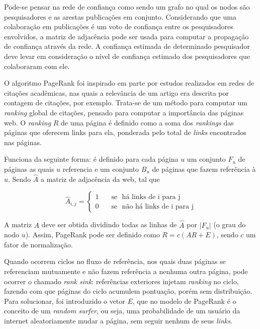 \documentclass[12pt]{article}
\begin{document}
Pode-se pensar na rede de confiança como sendo um grafo no qual os nodos são pesquisadores e as arestas publicações em conjunto.
Considerando que uma colaboração em publicações é um voto de confiança entre os pesquisadores envolvidos, a matriz de adjacência 
pode ser usada para computar a propagação de confiança através da rede. A confiança estimada de determinado pesquisador deve levar 
em consideração o nível de confiança estimado dos pesquisadores que colaboraram com ele.

O algoritmo PageRank \cite{page1999pagerank} foi inspirado em parte por estudos realizados em redes de citações acadêmicas, nas 
quais a relevância de um artigo era descrita por contagem de citações, por exemplo. Trata-se de um método para computar um \textit{ran\-king}  global de citações, pensado para computar a importância das páginas web. O \textit{ranking} $R$ de uma página é definido como a soma dos  \textit{rankings} das páginas que oferecem links para ela, ponderada pelo total de \textit{links} encontrados nas páginas.

Funciona da seguinte forma: é definido para cada página $u$ um conjunto $F_u$ de páginas as quais $u$ referencia e um conjunto $B_u$ de páginas que fazem referência à $u$. Sendo $\hat{A}$ a matriz de adjacência da web, tal que 

\begin{equation} \label{eqn:adjacency-matrix}
   \hat{A}_{i,j} =
    \begin{cases}
      1       & \quad \text{se } \text{ há links de i para j}\\
      0       & \quad \text{se } \text{ não há links de i para j}
    \end{cases}
\end{equation}

A matriz $A$ deve ser obtida dividindo todas as linhas de $\hat{A}$ por $|F_u|$ (o grau do nodo $u$). Assim, PageRank pode ser definido 
como $R = c(AR + E)$, sendo $c$ um fator de normalização.

Quando ocorrem ciclos no fluxo de referência, nos quais duas páginas se referenciam mutuamente e não fazem referência a nenhuma 
outra página, pode ocorrer o chamado \textit{rank sink}: referências exteriores injetam \textit{ranking} no ciclo, 
fazendo com que páginas do ciclo acumulem pontuação, porém sem distribuição. Para solucionar, foi introduzido o vetor $E$, que no modelo 
de PageRank é o conceito de um \textit{random surfer}, ou seja, uma probabilidade de um usuário da internet aleatoriamente mudar a 
página, sem seguir nenhum de seus \textit{links}. \cite{page1999pagerank}
\end{document}
